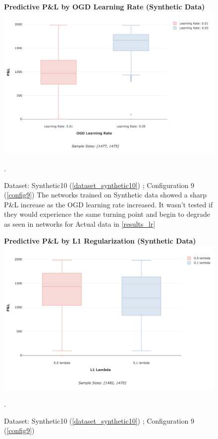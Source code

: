 \documentclass[a4paper,11pt,oneside]{article}
\theoremstyle{plain}
\theoremstyle{definition}
\begin{document}
	\begin{figure}[H]
		\centering 
		\textbf{Predictive P\&L by OGD Learning Rate (Synthetic Data)}
		\includegraphics[scale=0.3]{images/results/network/lr/synth_ogd_lr.png} 
		\caption[Predictive P\&L by OGD Learning Rate (Synthetic Data)]{Dataset: Synthetic10 (\ref{dataset_synthetic10}) ;  Configuration 9 (\ref{config9}) 
			\newline The networks trained on Synthetic data showed a sharp P\&L increase as the OGD learning rate increased. It wasn't tested if they would experience the same turning point and begin to degrade as seen in networks for Actual data in \ref{results_lr}}.
		\label{figure-synth_ogd_lr}
	\end{figure}
	
	\begin{figure}[H]
		\centering 
		\textbf{Predictive P\&L by L1 Regularization (Synthetic Data)}
		\includegraphics[scale=0.3]{images/results/network/reg/synth_pl_reg.png} 
		\caption[Predictive P\&L by L1 Regularization (Synthetic Data)]{Dataset: Synthetic10 (\ref{dataset_synthetic10}) ; Configuration 9 (\ref{config9})  
			\newline }.
		\label{figure-synth_pl_reg}
	\end{figure}
	
\end{document}

